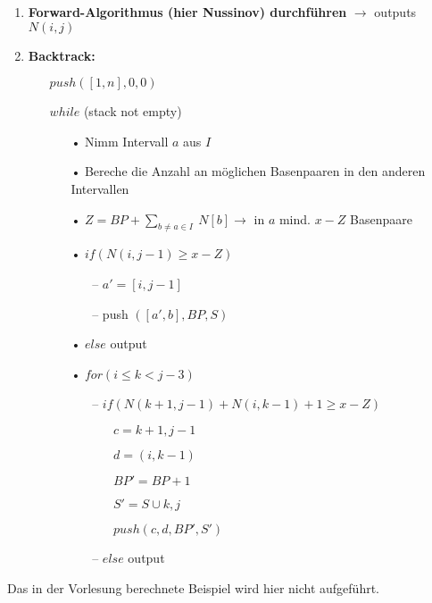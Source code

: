 \begin{enumerate}
\item\textbf{Forward-Algorithmus (hier Nussinov) durchführen} $\rightarrow$ outputs $N(i,j)$
\item\textbf{Backtrack:}
	\begin{itemize}
		\item[]$push ([1,n], 0, 0)$
		\item[]$while$ (stack not empty)
		\begin{itemize}
			\item[•]Nimm Intervall $a$ aus $I$
			\item[•]Bereche die Anzahl an möglichen Basenpaaren in den anderen Intervallen
			\item[•]$Z=BP + \displaystyle\sum_{b\neq a \in I}\ N[b] \rightarrow$ in $a$ mind. $x-Z$ Basenpaare
			\item[•]$ if (N(i, j-1)\ge x-Z)$
			\begin{itemize}
				\item[--]$a' = [i, j-1]$
				\item[--]push $([a',b],BP,S)$
			\end{itemize}
			\item[•]$else$ output
			\item[•]$for (i\le k < j-3)$
			\begin{itemize}
				\item[--]$if (N(k+1,j-1)+N(i,k-1)+1\ge x-Z)$
				\begin{itemize}
				\item[]$c=k+1, j-1$
				\item[]$d=(i, k-1)$
				\item[]$BP'=BP+1$
				\item[]$S'=S\cup {k,j}$
				\item[]$push (c,d,BP',S')$
				\end{itemize}
				\item[--]$else$ output
			\end{itemize}
		\end{itemize}
	\end{itemize}
\end{enumerate}
Das in der Vorlesung berechnete Beispiel wird hier nicht aufgeführt.